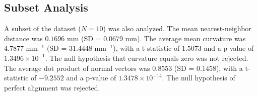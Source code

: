 \subsection{Subset Analysis}

A subset of the dataset ($N = 10$) was also analyzed. The mean nearest-neighbor distance was $0.1696$ mm (SD = $0.0679$ mm). The average mean curvature was $4.7877$ mm$^{-1}$ (SD = $31.4448$ mm$^{-1}$), with a t-statistic of $1.5073$ and a p-value of $1.3496 \times 10^{-1}$. The null hypothesis that curvature equals zero was not rejected. The average dot product of normal vectors was $0.8553$ (SD = $0.1458$), with a t-statistic of $-9.2552$ and a p-value of $1.3478 \times 10^{-14}$. The null hypothesis of perfect alignment was rejected.